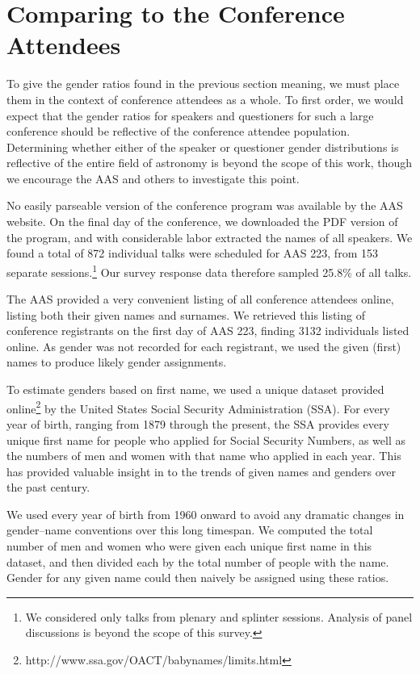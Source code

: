 \documentclass[iop]{emulateapj}
\begin{document}
\section{Comparing to the Conference Attendees} 
To give the gender ratios found in the previous section meaning, we must place them in the context of conference attendees as a whole. To first order, we would expect that the gender ratios for speakers and questioners for such a large conference should be reflective of the conference attendee population. Determining whether either of the speaker or questioner gender distributions is reflective of the entire field of astronomy is beyond the scope of this work, though we encourage the AAS and others to investigate this point.


No easily parseable version of the conference program was available by the AAS website. 
On the final day of the conference, we downloaded the PDF version of the program, and with considerable labor extracted the names of all speakers. We found a total of 872 individual talks were scheduled for AAS 223, from 153 separate sessions.\footnote{We considered only talks from plenary and splinter sessions. Analysis of panel discussions is beyond the scope of this survey.} Our survey response data therefore sampled 25.8\% of all talks.

The AAS provided a very convenient listing of all conference attendees online, listing both their given names and surnames. We retrieved this listing of conference registrants on the first day of AAS 223, finding 3132 individuals listed online. As gender was not recorded for each registrant, we used the given (first) names to produce likely gender assignments.

To estimate genders based on first name, we used a unique dataset provided online\footnote{http://www.ssa.gov/OACT/babynames/limits.html}  by the United States Social Security Administration (SSA). For every year of birth, ranging from 1879 through the present, the SSA provides every unique first name for people who applied for Social Security Numbers, as well as the numbers of men and women with that name who applied in each year. This has provided valuable insight in to the trends of given names and genders over the past century.


We used every year of birth from 1960 onward to avoid any dramatic changes in gender--name conventions over this long timespan. We computed the total number of men and women who were given each unique first name in this dataset, and then divided each by the total number of people with the name. Gender for any given name could then naively be assigned using these ratios. 
\end{document}
